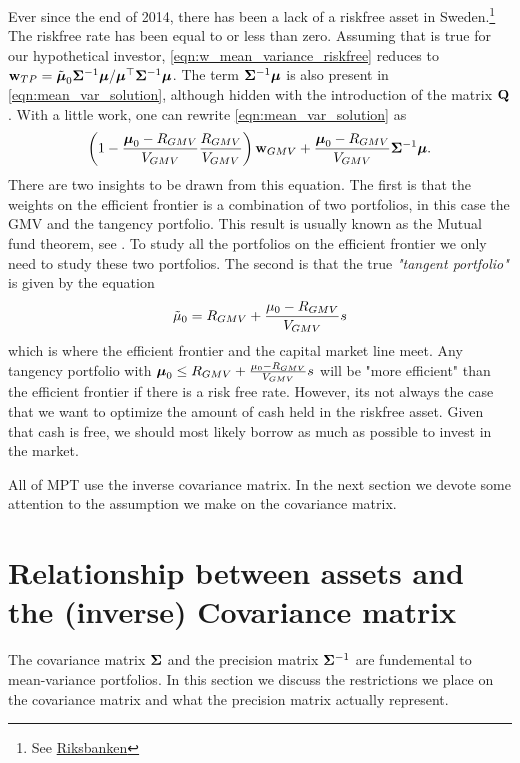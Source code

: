 \documentclass[oneside]{book}\usepackage{knitr}
\begin{document}
Ever since the end of 2014, there has been a lack of a riskfree asset in Sweden.\footnote{See \href{https://www.riksbank.se/sv/statistik/sok-rantor--valutakurser/reporanta-in--och-utlaningsranta/}{Riksbanken}} The riskfree rate has been equal to or less than zero. Assuming that is true for our hypothetical investor, \eqref{eqn:w_mean_variance_riskfree} reduces to $\mathbf{w}_{TP} = \tilde{\mbox{\boldmath$\mu$}}_0 \mathbf{\Sigma}^{-1} \mbox{\boldmath$\mu$} / \mbox{\boldmath$\mu$}^\top \mathbf{\Sigma}^{-1} \mbox{\boldmath$\mu$}$. The term $\mathbf{\Sigma}^{-1} \mbox{\boldmath$\mu$}$ is also present in \eqref{eqn:mean_var_solution}, although hidden with the introduction of the matrix $\mathbf{Q}$. With a little work, one can rewrite \eqref{eqn:mean_var_solution} as
$$
\left(1 - \frac{\mbox{\boldmath$\mu$}_0-R_{GMV}}{V_{GMV}} \frac{R_{GMV}}{V_{GMV}} \right) \mathbf{w}_{GMV} + \frac{\mbox{\boldmath$\mu$}_0-R_{GMV}}{V_{GMV}} \mathbf{\Sigma}^{-1} \mbox{\boldmath$\mu$}.
$$
There are two insights to be drawn from this equation. The first is that the weights on the efficient frontier is a combination of two portfolios, in this case the GMV and the tangency portfolio. This result is usually known as the Mutual fund theorem, see \textcite{tobin1958liquidity}. To study all the portfolios on the efficient frontier we only need to study these two portfolios. The second is that the true \textit{"tangent portfolio"} is given by the equation
$$
\tilde\mu_0 = R_{GMV} + \frac{\mu_0-R_{GMV}}{V_{GMV}} s  
$$
which is where the efficient frontier and the capital market line meet. Any tangency portfolio with $\mbox{\boldmath$\mu$}_0\leq R_{GMV} + \frac{\mu_0-R_{GMV}}{V_{GMV}} s$ will be "more efficient" than the efficient frontier if there is a risk free rate. However, its not always the case that we want to optimize the amount of cash held in the riskfree asset. Given that cash is free, we should most likely borrow as much as possible to invest in the market. 

All of MPT use the inverse covariance matrix. In the next section we devote some attention to the assumption we make on the covariance matrix.  

\section{Relationship between assets and the (inverse) Covariance matrix}\label{subsec:cov_prec_matrix}
The covariance matrix $\mathbf{\Sigma}$ and the precision matrix $\mathbf{\Sigma}^{-1}$ are fundemental to mean-variance portfolios. In this section we discuss the restrictions we place on the covariance matrix and what the precision matrix actually represent. 
\end{document}

